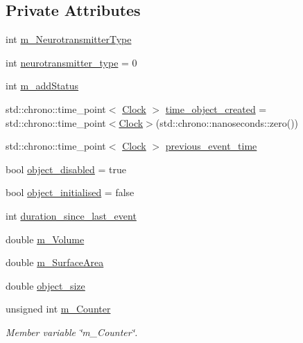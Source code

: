 \subsection*{Private Attributes}
\begin{DoxyCompactItemize}
\item 
int \mbox{\hyperlink{classNeurotransmitter_aaabafa90f31a1afd660c654d6066820b}{m\+\_\+\+Neurotransmitter\+Type}}
\item 
int \mbox{\hyperlink{classNeurotransmitter_a53484821d08c351a07ea9774d09434b1}{neurotransmitter\+\_\+type}} = 0
\item 
int \mbox{\hyperlink{classNeurotransmitter_ac15c7d29a34d8b8a75de5d851c3b5e73}{m\+\_\+add\+Status}}
\item 
std\+::chrono\+::time\+\_\+point$<$ \mbox{\hyperlink{universe_8h_a0ef8d951d1ca5ab3cfaf7ab4c7a6fd80}{Clock}} $>$ \mbox{\hyperlink{classNeurotransmitter_acad5444f7486ee9c2d3bff1b6b3f59ad}{time\+\_\+object\+\_\+created}} = std\+::chrono\+::time\+\_\+point$<$\mbox{\hyperlink{universe_8h_a0ef8d951d1ca5ab3cfaf7ab4c7a6fd80}{Clock}}$>$(std\+::chrono\+::nanoseconds\+::zero())
\item 
std\+::chrono\+::time\+\_\+point$<$ \mbox{\hyperlink{universe_8h_a0ef8d951d1ca5ab3cfaf7ab4c7a6fd80}{Clock}} $>$ \mbox{\hyperlink{classNeurotransmitter_a47efa9a5481fae796df7f1020a15e2f2}{previous\+\_\+event\+\_\+time}}
\item 
bool \mbox{\hyperlink{classNeurotransmitter_a27175b3f5400e9d341291b11828ea32e}{object\+\_\+disabled}} = true
\item 
bool \mbox{\hyperlink{classNeurotransmitter_ab5e0c93e6f54bec95c294bc59427a54a}{object\+\_\+initialised}} = false
\item 
int \mbox{\hyperlink{classNeurotransmitter_acbf1efa25f5b69954d9baaacf273e8da}{duration\+\_\+since\+\_\+last\+\_\+event}}
\item 
double \mbox{\hyperlink{classNeurotransmitter_a82764f72535f859b74d419bad922253a}{m\+\_\+\+Volume}}
\item 
double \mbox{\hyperlink{classNeurotransmitter_ae1dea2e0732f91027f4597a6ca4588fc}{m\+\_\+\+Surface\+Area}}
\item 
double \mbox{\hyperlink{classNeurotransmitter_afed70401d85814b609c569a9c79f6a16}{object\+\_\+size}}
\item 
unsigned int \mbox{\hyperlink{classNeurotransmitter_a39531872ba361395e620745e28bdc8d4}{m\+\_\+\+Counter}}
\begin{DoxyCompactList}\small\item\em Member variable \char`\"{}m\+\_\+\+Counter\char`\"{}. \end{DoxyCompactList}\item 

\end{DoxyCompactItemize}
